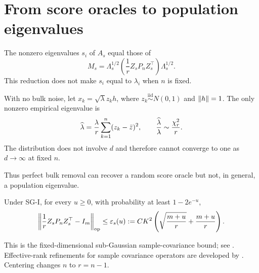 \section{From score oracles to population eigenvalues}\label{sec:population}
The nonzero eigenvalues $s_i$ of $A_s$ equal those of
\begin{equation}\label{eq:Ms}
M_s=\Lambda_s^{1/2}\left(\frac1rZ_sP_nZ_s^\top\right)\Lambda_s^{1/2}.
\end{equation}
This reduction does not make $s_i$ equal to $\lambda_i$ when $n$ is fixed.

\begin{example}\label{ex:rankone}
With no bulk noise, let $x_k=\sqrt\lambda z_kh$, where $z_k\stackrel{\mathrm{iid}}{\sim}N(0,1)$ and $\left\lVert h\right\rVert=1$.  The only nonzero empirical eigenvalue is
\begin{equation}
\widehat{\lambda}=\frac\lambda r\sum_{k=1}^n(z_k-\bar z)^2,
\qquad \frac{\widehat{\lambda}}{\lambda}\sim\frac{\chi_r^2}{r}.
\end{equation}
The distribution does not involve $d$ and therefore cannot converge to one as $d\to\infty$ at fixed $n$.
\end{example}
Thus perfect bulk removal can recover a random score oracle but not, in general, a population eigenvalue.

\begin{lemma}\label{lem:scoreconcentration}
Under SG-I, for every $u\ge0$, with probability at least $1-2e^{-u}$,
\begin{equation}\label{eq:scoreconcentration}
\left\lVert\frac1rZ_sP_nZ_s^\top-I_m\right\rVert_{\mathrm{op}}
\le\varepsilon_s(u):=CK^2\left(\sqrt{\frac{m+u}{r}}+\frac{m+u}{r}\right).
\end{equation}
\end{lemma}
This is the fixed-dimensional sub-Gaussian sample-covariance bound; see \citet{Vershynin2018}.  Effective-rank refinements for sample covariance operators are developed by \citet{KoltchinskiiLounici2017}.  Centering changes $n$ to $r=n-1$.

